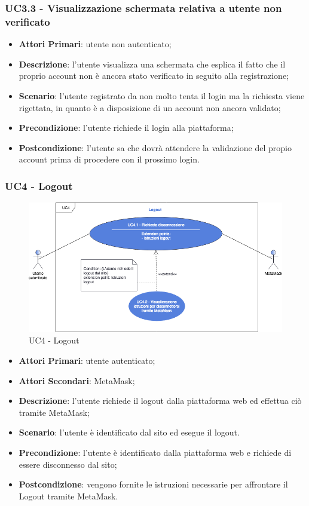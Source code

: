 \subsubsection{UC3.3 - Visualizzazione schermata relativa a utente non verificato}
\begin{itemize}
	\item \textbf{Attori Primari}:
	utente non autenticato;
	\item \textbf{Descrizione}:
	l'utente visualizza una schermata che esplica il fatto che il proprio account non è ancora stato verificato in seguito alla registrazione;
	\item \textbf{Scenario}:
	l'utente registrato da non molto tenta il login ma la richiesta viene rigettata, in quanto è a disposizione di un account non ancora validato;
	\item \textbf{Precondizione}:
	l'utente richiede il login alla piattaforma;
	\item \textbf{Postcondizione}: l'utente sa che dovrà attendere la validazione del propio account prima di procedere con il prossimo login.
\end{itemize}
\subsubsection{UC4 - Logout}
\begin{figure}[h]
	\includegraphics[width=15.5cm]{res/images/UC4Logout.png} %
	\centering
	\caption{UC4 - Logout}
	
\end{figure}
\begin{itemize}
	\item \textbf{Attori Primari}:
	utente autenticato;
	\item \textbf{Attori Secondari}:
	MetaMask\glo;
	\item \textbf{Descrizione}: l'utente richiede il logout dalla piattaforma web ed effettua ciò tramite MetaMask\glo;
	\item \textbf{Scenario}: l'utente è identificato dal sito ed esegue il logout.
	\item \textbf{Precondizione}: l'utente è identificato dalla piattaforma web e richiede di essere disconnesso dal sito;
	\item \textbf{Postcondizione}: vengono fornite le istruzioni necessarie per affrontare il Logout tramite MetaMask\glo. 
\end{itemize}
